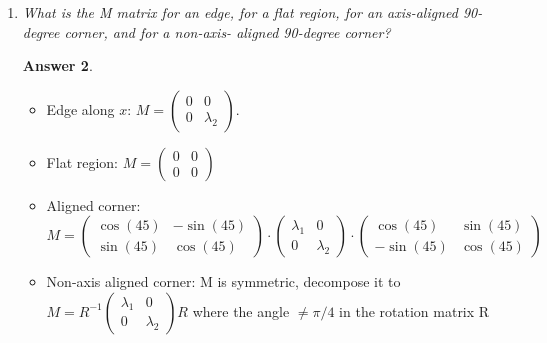 \documentclass[a4paper,12 pt]{article}
\theoremstyle{definition}
\theoremstyle{remark}
\theoremstyle{definition}
\theoremstyle{definition}
\theoremstyle{definition}
\theoremstyle{definition}
\theoremstyle{remark}
\theoremstyle{remark}
\theoremstyle{definition}
\theoremstyle{definition}
\newtheorem*{answer}{Answer}
\begin{document}
\begin{enumerate}
\begin{enumerate}
\begin{answer}
\begin{equation}
SSD(\Delta x, \Delta y)\approx \begin{pmatrix}
 \Delta x & \Delta y 
 \end{pmatrix}\cdot \underbrace{\sum_{x,y\in P} \begin{pmatrix}
I_x^2&I_xI_y \\ I_xI_y&I_y^2
\end{pmatrix}}_{M}\cdot \begin{pmatrix}
 \Delta x\\
 \Delta y
 \end{pmatrix},
 \end{equation}
 where $M$ is the second moment matrix. The elements from the matrix are \textbf{pixel-wise products}!

\end{answer}
\item \textit{What is the M matrix for an edge, for a flat region, for an axis-aligned 90-degree corner, and for a non-axis- aligned 90-degree corner? }
\begin{answer}
\
\begin{itemize}
\item Edge along $x$: $M=\begin{pmatrix} 0&0\\ 0&\lambda_2
\end{pmatrix}$.
\item Flat region: $M=\begin{pmatrix} 0&0\\ 0&0 \end{pmatrix}$
\item Aligned corner: $M=\begin{pmatrix} \cos(45)&-\sin(45)\\ \sin(45) & \cos(45) \end{pmatrix}\cdot \begin{pmatrix} \lambda_1 &0 \\
0& \lambda_2 \end{pmatrix}\cdot \begin{pmatrix} \cos(45)&\sin(45)\\ -\sin(45) & \cos(45) \end{pmatrix}$
\item Non-axis aligned corner: M is symmetric, decompose it to $M=R^{-1}\begin{pmatrix}
\lambda_1 &0 \\
0  &\lambda_2
\end{pmatrix} R$ where the angle $\neq \pi /4$ in the rotation matrix R

\end{itemize}
\end{answer}
\end{enumerate}
\end{enumerate}
\end{document}
